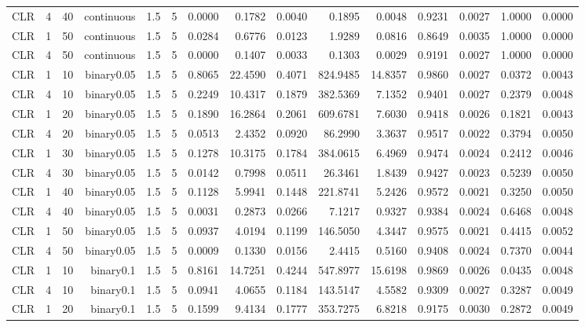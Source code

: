 \begin{longtable}{rrrrrrrrrrrrrrr}
  CLR & 4 & 40 & continuous & 1.5 & 5 & 0.0000 & 0.1782 & 0.0040 & 0.1895 & 0.0048 & 0.9231 & 0.0027 & 1.0000 & 0.0000 \\ 
  CLR & 1 & 50 & continuous & 1.5 & 5 & 0.0284 & 0.6776 & 0.0123 & 1.9289 & 0.0816 & 0.8649 & 0.0035 & 1.0000 & 0.0000 \\ 
  CLR & 4 & 50 & continuous & 1.5 & 5 & 0.0000 & 0.1407 & 0.0033 & 0.1303 & 0.0029 & 0.9191 & 0.0027 & 1.0000 & 0.0000 \\ 
  CLR & 1 & 10 & binary0.05 & 1.5 & 5 & 0.8065 & 22.4590 & 0.4071 & 824.9485 & 14.8357 & 0.9860 & 0.0027 & 0.0372 & 0.0043 \\ 
  CLR & 4 & 10 & binary0.05 & 1.5 & 5 & 0.2249 & 10.4317 & 0.1879 & 382.5369 & 7.1352 & 0.9401 & 0.0027 & 0.2379 & 0.0048 \\ 
  CLR & 1 & 20 & binary0.05 & 1.5 & 5 & 0.1890 & 16.2864 & 0.2061 & 609.6781 & 7.6030 & 0.9418 & 0.0026 & 0.1821 & 0.0043 \\ 
  CLR & 4 & 20 & binary0.05 & 1.5 & 5 & 0.0513 & 2.4352 & 0.0920 & 86.2990 & 3.3637 & 0.9517 & 0.0022 & 0.3794 & 0.0050 \\ 
  CLR & 1 & 30 & binary0.05 & 1.5 & 5 & 0.1278 & 10.3175 & 0.1784 & 384.0615 & 6.4969 & 0.9474 & 0.0024 & 0.2412 & 0.0046 \\ 
  CLR & 4 & 30 & binary0.05 & 1.5 & 5 & 0.0142 & 0.7998 & 0.0511 & 26.3461 & 1.8439 & 0.9427 & 0.0023 & 0.5239 & 0.0050 \\ 
  CLR & 1 & 40 & binary0.05 & 1.5 & 5 & 0.1128 & 5.9941 & 0.1448 & 221.8741 & 5.2426 & 0.9572 & 0.0021 & 0.3250 & 0.0050 \\ 
  CLR & 4 & 40 & binary0.05 & 1.5 & 5 & 0.0031 & 0.2873 & 0.0266 & 7.1217 & 0.9327 & 0.9384 & 0.0024 & 0.6468 & 0.0048 \\ 
  CLR & 1 & 50 & binary0.05 & 1.5 & 5 & 0.0937 & 4.0194 & 0.1199 & 146.5050 & 4.3447 & 0.9575 & 0.0021 & 0.4415 & 0.0052 \\ 
  CLR & 4 & 50 & binary0.05 & 1.5 & 5 & 0.0009 & 0.1330 & 0.0156 & 2.4415 & 0.5160 & 0.9408 & 0.0024 & 0.7370 & 0.0044 \\ 
  CLR & 1 & 10 & binary0.1 & 1.5 & 5 & 0.8161 & 14.7251 & 0.4244 & 547.8977 & 15.6198 & 0.9869 & 0.0026 & 0.0435 & 0.0048 \\ 
  CLR & 4 & 10 & binary0.1 & 1.5 & 5 & 0.0941 & 4.0655 & 0.1184 & 143.5147 & 4.5582 & 0.9309 & 0.0027 & 0.3287 & 0.0049 \\ 
  CLR & 1 & 20 & binary0.1 & 1.5 & 5 & 0.1599 & 9.4134 & 0.1777 & 353.7275 & 6.8218 & 0.9175 & 0.0030 & 0.2872 & 0.0049 \\ 

\end{longtable}

